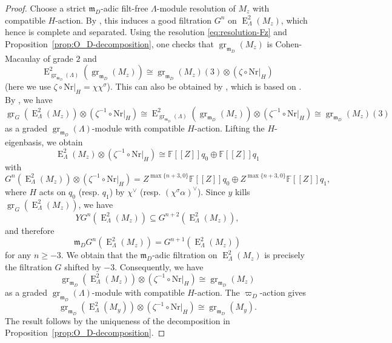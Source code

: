 \documentclass[11pt,a4paper]{article} %
\def\FF{\mathbb{F}}
\def\E{\operatorname{E}}
\def\Ext{\operatorname{Ext}} %
\def\gr{\operatorname{gr}}
\def\max{\operatorname{max}}
\begin{document}
\begin{proof}
    Choose a strict $\mathfrak{m}_D$-adic filt-free $\Lambda$-module resolution of $M_z$ with compatible $H$-action. By \cite[Lemma III.2.2.3(1)]{LvO96}, this induces a good filtration $G^n$ on $\E_\Lambda^2(M_z)$, which hence is complete and separated. %
    Using the resolution \eqref{eq:resolution-Fz} and Proposition~\ref{prop:O_D-decomposition}, one checks that $\gr_{\mathfrak{m}_D}(M_z)$ is Cohen-Macaulay of grade $2$ and
    \[
    \E^2_{\gr_{\mathfrak{m}_D}(\Lambda)}\left(\gr_{\mathfrak{m}_D}(M_z)\right)\cong\gr_{\mathfrak{m}_D}(M_z)(3)\otimes(\zeta\circ\mathrm{Nr}|_H)
    \]
    (here we use $\zeta\circ\mathrm{Nr}|_H=\chi\chi^{\sigma}$). This can also be obtained by \cite[Corollary 4.14]{Zhao}, which is based on \cite[Lemma 3.3.1.9, Proposition 3.3.1.10]{BHHMS2}. By \cite[Proposition 3.3.4.6]{BHHMS2}, we have
    \[
    \gr_G\left(\E_\Lambda^2(M_z)\right)\otimes(\zeta^{-1}\circ\mathrm{Nr}|_H)\cong\E^2_{\gr_{\mathfrak{m}_D}(\Lambda)}\left(\gr_{\mathfrak{m}_D}(M_z)\right)\otimes(\zeta^{-1}\circ\mathrm{Nr}|_H)\cong\gr_{\mathfrak{m}_D}(M_z)(3)
    \]
    as a graded $\gr_{\mathfrak{m}_D}(\Lambda)$-module with compatible $H$-action. Lifting the $H$-eigenbasis, we obtain 
    \[
    \E_\Lambda^2(M_z)\otimes(\zeta^{-1}\circ\mathrm{Nr}|_H)\cong\FF[[Z]]q_0\oplus\FF[[Z]]q_1
    \]
    with 
    \[
    G^n\left(\E_\Lambda^2(M_z)\right)\otimes(\zeta^{-1}\circ\mathrm{Nr}|_H)=Z^{\max\{n+3,0\}}\FF[[Z]]q_0\oplus Z^{\max\{n+3,0\}}\FF[[Z]]q_1,
    \]
    where $H$ acts on $q_0$ (resp. $q_1$) by $\chi^\vee$ (resp. $(\chi^\sigma\alpha)^\vee$). Since $y$ kills $\gr_G\left(\E_\Lambda^2(M_z)\right)$, we have 
    \[
    YG^n\left(\E_\Lambda^2(M_z)\right)\subseteq G^{n+2}\left(\E_\Lambda^2(M_z)\right),
    \]
    and therefore 
    \[
    \mathfrak{m}_DG^n\left(\E_\Lambda^2(M_z)\right)=G^{n+1}\left(\E_\Lambda^2(M_z)\right)
    \]
    for any $n\ge-3$. We obtain that the $\mathfrak{m}_D$-adic filtration on $\E_\Lambda^2(M_z)$ is precisely the filtration $G$ shifted by $-3$. Consequently, we have 
    \[
    \gr_{\mathfrak{m}_D}\left(\E_\Lambda^2(M_z)\right)\otimes(\zeta^{-1}\circ\mathrm{Nr}|_H)\cong\gr_{\mathfrak{m}_D}(M_z)
    \]
    as a graded $\gr_{\mathfrak{m}_D}(\Lambda)$-module with compatible $H$-action. The $\varpi_D$-action gives 
    \[
    \gr_{\mathfrak{m}_D}\left(\E_\Lambda^2(M_y)\right)\otimes(\zeta^{-1}\circ\mathrm{Nr}|_H)\cong\gr_{\mathfrak{m}_D}(M_y).    
    \]
    The result follows by the uniqueness of the decomposition in Proposition~\ref{prop:O_D-decomposition}.
\end{proof}
\end{document}
